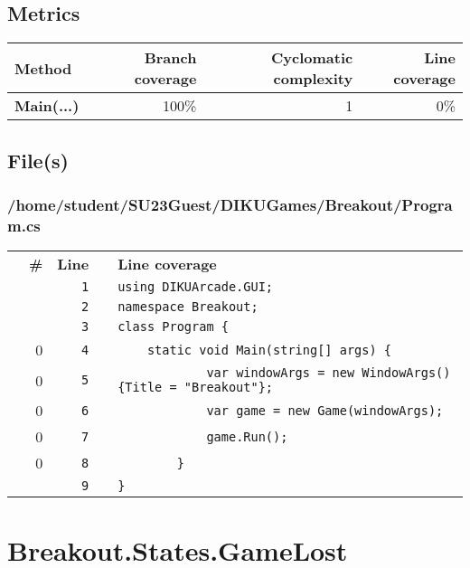 \documentclass[a4paper,landscape,10pt]{article}
\begin{document}
\subsection{Metrics}
\begin{longtable}[l]{|l|r|r|r|}
\hline
\textbf{Method} & \textbf{Branch coverage} & \textbf{Cyclomatic complexity} & \textbf{Line coverage}\\
\hline
\textbf{Main(...)} & 100\% & 1 & 0\%\\
\hline
\end{longtable}
\subsection{File(s)}
\subsubsection{/home/student/SU23Guest/DIKUGames/Breakout/Program.cs}
\begin{longtable}[l]{lrrll}
\textbf{} & \textbf{\#} & \textbf{Line} & \textbf{} & \textbf{Line coverage}\\
\cellcolor{gray} &  & \verb~1~ & & \verb~using DIKUArcade.GUI;~\\
\cellcolor{gray} &  & \verb~2~ & & \verb~namespace Breakout;~\\
\cellcolor{gray} &  & \verb~3~ & & \verb~class Program {~\\
\cellcolor{red} & 0 & \verb~4~ & & \verb~    static void Main(string[] args) {~\\
\cellcolor{red} & 0 & \verb~5~ & & \verb~            var windowArgs = new WindowArgs() {Title = "Breakout"};~\\
\cellcolor{red} & 0 & \verb~6~ & & \verb~            var game = new Game(windowArgs);~\\
\cellcolor{red} & 0 & \verb~7~ & & \verb~            game.Run();~\\
\cellcolor{red} & 0 & \verb~8~ & & \verb~        }~\\
\cellcolor{gray} &  & \verb~9~ & & \verb~}~\\
\end{longtable}
\newpage
\section{Breakout.States.GameLost}
\end{document}
